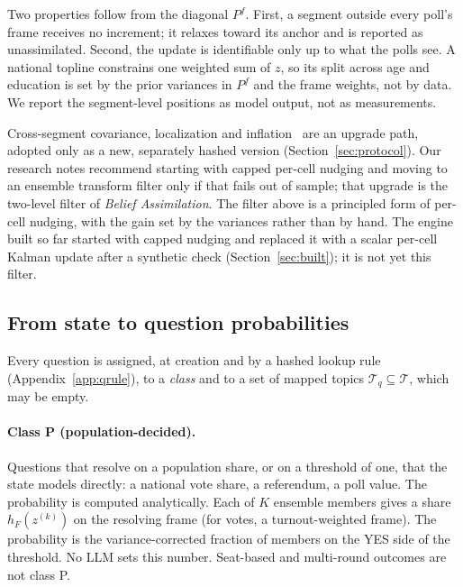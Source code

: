 \documentclass[11pt]{article}
\begin{document}
Two properties follow from the diagonal $P^f$. First, a segment outside every poll's frame receives no increment; it relaxes toward its anchor and is reported as unassimilated. Second, the update is identifiable only up to what the polls see. A national topline constrains one weighted sum of $z$, so its split across age and education is set by the prior variances in $P^f$ and the frame weights, not by data. We report the segment-level positions as model output, not as measurements.

Cross-segment covariance, localization and inflation~\citep{houtekamer2001sequential,anderson2001ensemble,hunt2007efficient} are an upgrade path, adopted only as a new, separately hashed version (Section~\ref{sec:protocol}). Our research notes recommend starting with capped per-cell nudging and moving to an ensemble transform filter only if that fails out of sample; that upgrade is the two-level filter of \emph{Belief Assimilation}. The filter above is a principled form of per-cell nudging, with the gain set by the variances rather than by hand. The engine built so far started with capped nudging and replaced it with a scalar per-cell Kalman update after a synthetic check (Section~\ref{sec:built}); it is not yet this filter.

\subsection{From state to question probabilities}\label{sec:forecast}
Every question is assigned, at creation and by a hashed lookup rule (Appendix~\ref{app:qrule}), to a \emph{class} and to a set of mapped topics $\mathcal{T}_q\subseteq\mathcal{T}$, which may be empty.

\paragraph{Class P (population-decided).} Questions that resolve on a population share, or on a threshold of one, that the state models directly: a national vote share, a referendum, a poll value. The probability is computed analytically. Each of $K$ ensemble members gives a share $h_F(z^{(k)})$ on the resolving frame (for votes, a turnout-weighted frame). The probability is the variance-corrected fraction of members on the YES side of the threshold. No LLM sets this number. Seat-based and multi-round outcomes are not class P.
\end{document}
